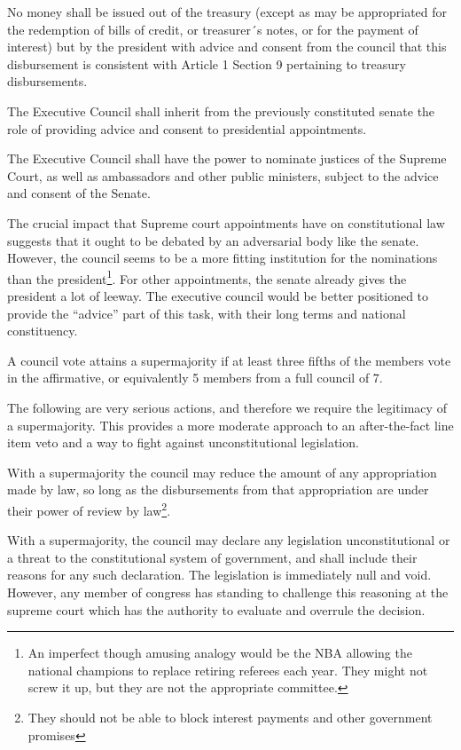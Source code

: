 \documentclass{article}
\begin{document}
\begin{quoting}
No money shall be issued out of the treasury (except as may be appropriated for the redemption of bills of credit, or treasurer´s notes, or for the payment of interest) but by the president with advice and consent from the council that this disbursement is consistent with Article 1 Section 9 pertaining to treasury disbursements.

The Executive Council shall inherit from the previously constituted senate the role of providing advice and consent to presidential appointments.

The Executive Council shall have the power to nominate justices of the Supreme Court, as well as ambassadors and other public ministers, subject to the advice and consent of the Senate.
\end{quoting}

The crucial impact that Supreme court appointments have on constitutional law suggests that it ought to be debated by an adversarial body like the senate. However, the council seems to be a more fitting institution for the nominations than the president\footnote{An imperfect though amusing analogy would be the NBA allowing the national champions to replace retiring referees each year. They might not screw it up, but they are not the appropriate committee.}. For other appointments, the senate already gives the president a lot of leeway. The executive council would be better positioned to provide the “advice” part of this task, with their long terms and national constituency.

\begin{quoting}
A council vote attains a supermajority if at least three fifths of the members vote in the affirmative, or equivalently 5 members from a full council of 7.
\end{quoting}

The following are very serious actions, and therefore we require the legitimacy of a supermajority. This provides a more moderate approach to an after-the-fact line item veto and a way to fight against unconstitutional legislation.

\begin{quoting}
With a supermajority the council may reduce the amount of any appropriation made by law, so long as the disbursements from that appropriation are under their power of review by law\footnote{They should not be able to block interest payments and other government promises}.

With a supermajority, the council may declare any legislation unconstitutional or a threat to the constitutional system of government, and shall include their reasons for any such declaration. The legislation is immediately null and void. However, any member of congress has standing to challenge this reasoning at the supreme court which has the authority to evaluate and overrule the decision.
\end{quoting}
\end{document}
